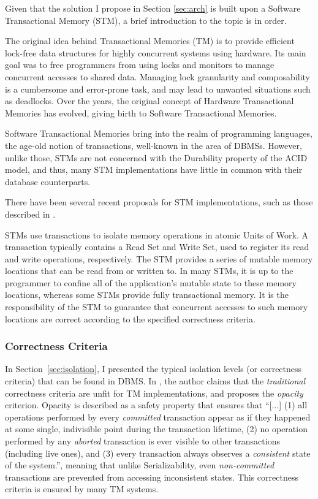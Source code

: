 \documentclass{llncs}
\begin{document}
Given that the solution I propose in Section \ref{sec:arch} is built
upon a Software Transactional Memory (STM), a brief introduction to
the topic is in order.

The original idea behind Transactional Memories (TM) is to provide
efficient lock-free data structures for highly concurrent systems
\cite{herlihy1993transactional} using hardware. Its main goal was to
free programmers from using locks and monitors to manage concurrent
accesses to shared data. Managing lock granularity and composability
is a cumbersome and error-prone task, and may lead to unwanted
situations such as deadlocks. Over the years, the original concept of
Hardware Transactional Memories has evolved, giving birth to Software
Transactional Memories.

Software Transactional Memories bring into the realm of programming
languages, the age-old notion of transactions, well-known in the area
of DBMSs. However, unlike those, STMs are not concerned with the
Durability property of the ACID model, and thus, many STM
implementations have little in common with their database
counterparts.

There have been several recent proposals for STM implementations, such
as those described in \cite{cachopo2006versioned, herlihy2003software,
  marathe2005adaptive, dice2006transactional, riegel2006lazy,
  marathe2006lowering}.

STMs use transactions to isolate memory operations in atomic Units of
Work. A transaction typically contains a Read Set and Write Set, used
to register its read and write operations, respectively. The STM
provides a series of mutable memory locations that can be read from or
written to. In many STMs, it is up to the programmer to confine all of
the application's mutable state to these memory locations, whereas
some STMs provide fully transactional memory. It is the responsibility
of the STM to guarantee that concurrent accesses to such memory
locations are correct according to the specified correctness criteria.

\subsubsection{Correctness Criteria}

In Section~\ref{sec:isolation}, I presented the typical isolation
levels (or correctness criteria) that can be found in DBMS. In
\cite{guerraoui2008correctness}, the author claims that the {\it
  traditional} correctness criteria are unfit for TM implementations,
and proposes the {\it opacity} criterion. Opacity is described as a
safety property that ensures that ``[...] (1) all operations performed
by every {\it committed} transaction appear as if they happened at
some single, indivisible point during the transaction lifetime, (2) no
operation performed by any {\it aborted} transaction is ever visible
to other transactions (including live ones), and (3) every transaction
always observes a {\it consistent} state of the system.'', meaning
that unlike Serializability, even {\it non-committed} transactions are
prevented from accessing inconsistent states. This correctness
criteria is ensured by many TM systems.
\end{document}
